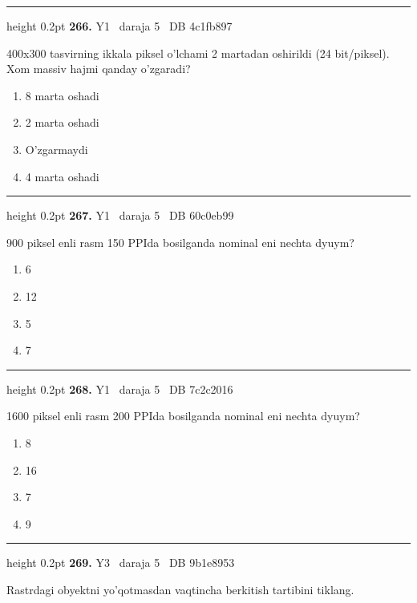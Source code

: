 \documentclass[10pt,a4paper,oneside]{article}
\begin{document}
\vspace{2mm}\hrule height 0.2pt \vspace{4mm}
\hypertarget{q266}{\textbf{\color{ink}266.}}  {\color{muted}\scriptsize Y1 \textbullet\ daraja 5 \textbullet\ DB 4c1fb897}
\par
400x300 tasvirning ikkala piksel o'lchami 2 martadan oshirildi (24 bit/piksel). Xom massiv hajmi qanday o'zgaradi?
\begin{enumerate}[label=\Alph*),leftmargin=9mm]
\item 8 marta oshadi
\item 2 marta oshadi
\item O'zgarmaydi
\item 4 marta oshadi
\end{enumerate}
\vspace{2mm}\hrule height 0.2pt \vspace{4mm}
\hypertarget{q267}{\textbf{\color{ink}267.}}  {\color{muted}\scriptsize Y1 \textbullet\ daraja 5 \textbullet\ DB 60c0eb99}
\par
900 piksel enli rasm 150 PPIda bosilganda nominal eni nechta dyuym?
\begin{enumerate}[label=\Alph*),leftmargin=9mm]
\item 6
\item 12
\item 5
\item 7
\end{enumerate}
\vspace{2mm}\hrule height 0.2pt \vspace{4mm}
\hypertarget{q268}{\textbf{\color{ink}268.}}  {\color{muted}\scriptsize Y1 \textbullet\ daraja 5 \textbullet\ DB 7c2c2016}
\par
1600 piksel enli rasm 200 PPIda bosilganda nominal eni nechta dyuym?
\begin{enumerate}[label=\Alph*),leftmargin=9mm]
\item 8
\item 16
\item 7
\item 9
\end{enumerate}
\vspace{2mm}\hrule height 0.2pt \vspace{4mm}
\hypertarget{q269}{\textbf{\color{ink}269.}}  {\color{muted}\scriptsize Y3 \textbullet\ daraja 5 \textbullet\ DB 9b1e8953}
\par
Rastrdagi obyektni yo'qotmasdan vaqtincha berkitish tartibini tiklang.
\end{document}
